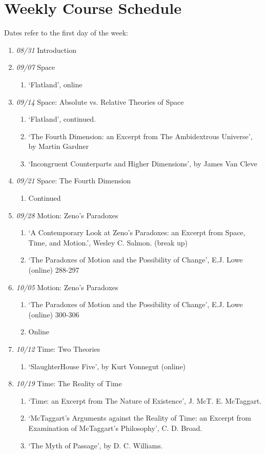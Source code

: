 \documentclass[11pt,article,oneside]{memoir}
\begin{document}
\section{Weekly Course Schedule}
Dates refer to the first day of the week: 
\begin{enumerate}
\item \textit{08/31} Introduction
\item \textit{09/07} Space
\begin{enumerate}
\item `Flatland', online
\end{enumerate}
\item \textit{09/14} Space: Absolute vs. Relative Theories of Space
\begin{enumerate}
\item `Flatland', continued.
\item `The Fourth Dimension: an Excerpt from The Ambidextrous Universe', by Martin Gardner
\item `Incongruent Counterparts and Higher Dimensions', by James Van Cleve
\end{enumerate}
\item \textit{09/21} Space: The Fourth Dimension
\begin{enumerate}
\item Continued
\end{enumerate}
\item \textit{09/28} Motion: Zeno's Paradoxes
\begin{enumerate}
\item `A Contemporary Look at Zeno’s Paradoxes: an Excerpt from Space, Time, and Motion.', Wesley C. Salmon. (break up)
\item `The Paradoxes of Motion and the Possibility of Change', E.J. Lowe (online) 288-297
\end{enumerate}
\item \textit{10/05} Motion: Zeno's Paradoxes
\begin{enumerate}
\item `The Paradoxes of Motion and the Possibility of Change', E.J. Lowe (online) 300-306
\item Online
\end{enumerate}
\item \textit{10/12} Time: Two Theories
\begin{enumerate}
\item `SlaughterHouse Five', by Kurt Vonnegut (online)
\end{enumerate}
\item  \textit{10/19} Time: The Reality of Time
\begin{enumerate}
\item `Time: an Excerpt from The Nature of Existence', J. McT. E. McTaggart.
\item `McTaggart’s Arguments against the Reality of Time: an Excerpt from Examination of McTaggart’s Philosophy', C. D. Broad.
\item `The Myth of Passage', by D. C. Williams.
\end{enumerate}


\end{enumerate}
\end{document}

